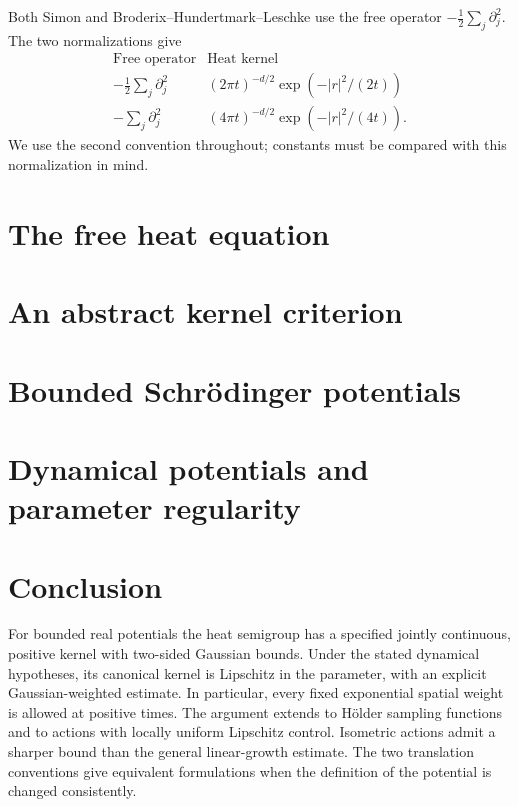 Both Simon and Broderix--Hundertmark--Leschke use the free operator
$-\tfrac12\sum_j\partial_j^2$. The two normalizations give
\[
\begin{array}{c|c}
\text{Free operator}&\text{Heat kernel}\\
-\tfrac12\sum_j\partial_j^2
 &(2\pi t)^{-d/2}\exp(-|r|^2/(2t))\\
-\sum_j\partial_j^2
 &(4\pi t)^{-d/2}\exp(-|r|^2/(4t)).
\end{array}
\]
We use the second convention throughout; constants must be compared
with this normalization in mind.

\chapter{The free heat equation}

\chapter{An abstract kernel criterion}

\chapter{Bounded Schr\"odinger potentials}

\chapter{Dynamical potentials and parameter regularity}


\chapter*{Conclusion}
For bounded real potentials the heat semigroup has a specified jointly
continuous, positive kernel with two-sided Gaussian bounds. Under the
stated dynamical hypotheses, its canonical kernel is Lipschitz in the
parameter, with an explicit Gaussian-weighted estimate. In particular,
every fixed exponential spatial weight is allowed at positive times.
The argument extends to Hölder sampling functions and to actions with
locally uniform Lipschitz control. Isometric actions admit a sharper
bound than the general linear-growth estimate. The two translation conventions give
equivalent formulations when the definition of the potential is changed
consistently.

